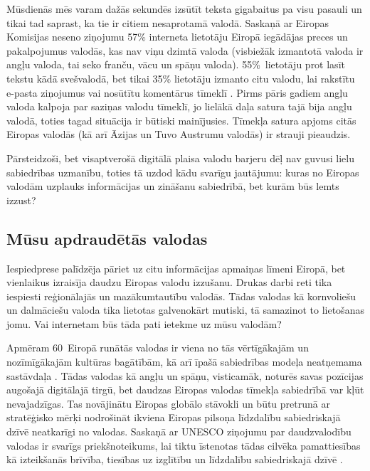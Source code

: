 \begin{multicols}{2}
Mūsdienās mēs varam dažās sekundēs izsūtīt teksta gigabaitus pa visu pasauli un tikai tad saprast, ka tie ir citiem nesaprotamā valodā. 
Saskaņā ar Eiropas Komisijas neseno ziņojumu 57\% interneta lietotāju Eiropā iegādājas preces un pakalpojumus valodās, kas nav viņu dzimtā valoda (visbiežāk izmantotā valoda ir angļu valoda, tai seko franču, vācu un spāņu valoda). 
55\%~lietotāju prot lasīt tekstu kādā svešvalodā, bet tikai 35\% lietotāju izmanto citu valodu, lai rakstītu e-pasta ziņojumus vai nosūtītu komentārus tīmeklī \cite{Meta48}. 
Pirms pāris gadiem angļu valoda kalpoja par saziņas valodu tīmeklī, jo lielākā daļa satura tajā bija angļu valodā, toties tagad situācija ir būtiski mainījusies. 
Tīmekļa satura apjoms citās Eiropas valodās (kā arī Āzijas un Tuvo Austrumu valodās) ir strauji pieaudzis.

Pārsteidzoši, bet visaptverošā digitālā plaisa valodu barjeru dēļ nav guvusi lielu sabiedrības uzmanību, toties tā uzdod kādu svarīgu jautājumu: kuras no Eiropas valodām uzplauks informācijas un zināšanu sabiedrībā, bet kurām būs lemts izzust?
\subsection{Mūsu apdraudētās valodas}

Iespiedprese palīdzēja pāriet uz citu informācijas apmaiņas līmeni Eiropā, bet vienlaikus izraisīja daudzu Eiropas valodu izzušanu. 
Drukas darbi reti tika iespiesti reģionālajās un mazākumtautību valodās. 
Tādas valodas kā kornvoliešu un dalmāciešu valoda tika lietotas galvenokārt mutiski, tā samazinot to lietošanas jomu. 
Vai internetam būs tāda pati ietekme uz mūsu valodām?


Apmēram 60~Eiropā runātās valodas ir viena no tās vērtīgākajām un nozīmīgākajām kultūras bagātībām, kā arī īpašā sabiedrības modeļa neatņemama sastāvdaļa \cite{Meta49}.
 Tādas valodas kā angļu un spāņu, visticamāk, noturēs savas pozīcijas augošajā digitālajā tirgū, bet daudzas Eiropas valodas tīmekļa sabiedrībā var kļūt nevajadzīgas. 
Tas novājinātu Eiropas globālo stāvokli un būtu pretrunā ar stratēģisko mērķi nodrošināt ikviena Eiropas pilsoņa līdzdalību sabiedriskajā dzīvē neatkarīgi no valodas. 
Saskaņā ar UNESCO ziņojumu par daudzvalodību valodas ir svarīgs priekšnoteikums, lai tiktu īstenotas tādas cilvēka pamattiesības kā izteikšanās brīvība, tiesības uz izglītību un līdzdalību sabiedriskajā dzīvē \cite{Meta50}.


\end{multicols}
